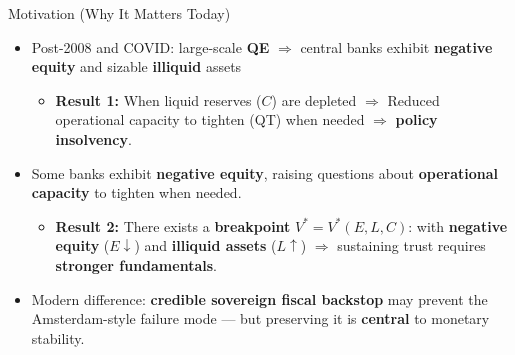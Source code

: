 \documentclass[aspectratio=169, xcolor=table]{beamer}
\begin{document}
\begin{frame}{Motivation (Why It Matters Today)}
  \begin{itemize}
    \item Post-2008 and COVID: large-scale \textbf{QE} $\Rightarrow$ central banks exhibit \textbf{negative equity} and  sizable \textbf{illiquid} assets
          \begin{itemize}
            \item \textbf{Result 1:} When liquid reserves ($C$) are depleted $\Rightarrow$ Reduced operational capacity to tighten (QT) when needed $\Rightarrow$ \textbf{policy insolvency}.
          \end{itemize}
    \item Some banks exhibit \textbf{negative equity}, raising questions about \textbf{operational capacity} to tighten when needed.
          \begin{itemize}
            \item \textbf{Result 2:} There exists a \textbf{breakpoint} $V^*=V^*(E,L,C)$: with \textbf{negative equity} ($E\downarrow$) and \textbf{illiquid assets} ($L\uparrow$) $\Rightarrow$ sustaining trust requires \textbf{stronger fundamentals}.
          \end{itemize}
          \pause
    \item Modern difference: \textbf{credible sovereign fiscal backstop} may prevent the Amsterdam-style failure mode — but preserving it is \textbf{central} to monetary stability.
  \end{itemize}
\end{frame}


\end{document}
